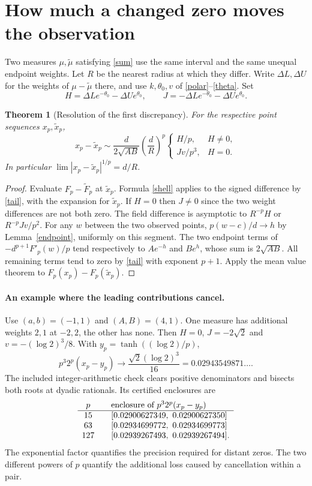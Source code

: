 \documentclass[11pt,letterpaper]{article}
\newtheorem{theorem}{Theorem}
\numberwithin{equation}{section}
\begin{document}
\section{How much a changed zero moves the observation}
Two measures $\mu,\widetilde\mu$ satisfying \eqref{sum} use the same
interval and the same unequal endpoint weights. Let $R$ be the nearest
radius at which they differ. Write $\Delta L,\Delta U$ for the weights of
$\mu-\widetilde\mu$ there, and use $k,\theta_0,v$ of
\eqref{polar}--\eqref{theta}. Set
\[
 H=\Delta L e^{-\theta_0}-\Delta U e^{\theta_0},\qquad
 J=-\Delta L e^{-\theta_0}-\Delta U e^{\theta_0}.
\]
\begin{theorem}[Resolution of the first discrepancy]\label{rate}
For the respective point sequences $x_p,\widetilde x_p$,
\[
 x_p-\widetilde x_p\sim
 \frac{d}{2\sqrt{AB}}\left(\frac dR\right)^p
 \begin{cases}
 H/p,&H\ne0,\\
 Jv/p^3,&H=0.
 \end{cases}
\]
In particular $\lim|x_p-\widetilde x_p|^{1/p}=d/R$.
\end{theorem}
\begin{proof}
Evaluate $F_p-\widetilde F_p$ at $\widetilde x_p$. Formula
\eqref{shell} applies to the signed difference by \eqref{tail}, with the
expansion for $\widetilde x_p$. If $H=0$ then $J\ne0$ since the two weight
differences are not both zero. The field difference is asymptotic to
$R^{-p}H$ or $R^{-p}Jv/p^2$. For any $w$ between the two observed points,
$p(w-c)/d\to h$ by Lemma~\ref{endpoint}, uniformly on this segment.
The two endpoint terms of $-d^{p+1} F'_p(w)/p$ tend respectively to
$Ae^{-h}$ and $Be^h$, whose sum is $2\sqrt{AB}$. All remaining terms tend
to zero by \eqref{tail} with exponent $p+1$. Apply the mean value theorem to
$F_p(x_p)-F_p(\widetilde x_p)$.
\end{proof}

\paragraph{An example where the leading contributions cancel.}
Use $(a,b)=(-1,1)$ and $(A,B)=(4,1)$. One measure has additional weights
$2,1$ at $-2,2$, the other has none. Then $H=0$, $J=-2\sqrt2$ and
$v=-(\log 2)^3/8$. With $y_p=\tanh((\log 2)/p)$,
\[
             p^3 2^p (x_p-y_p)\longrightarrow
             \frac{\sqrt2(\log 2)^3}{16}=0.02943549871\ldots .
\]
The included integer-arithmetic check clears positive denominators and
bisects both roots at dyadic rationals. Its certified enclosures are
\[
\begin{array}{c@{\qquad}l}
p&\text{enclosure of }p^3 2^p(x_p-y_p)\\ \hline
15 &[0.02900627349,\ 0.02900627350]\\
63 &[0.02934699772,\ 0.02934699773]\\
127 &[0.02939267493,\ 0.02939267494].
\end{array}
\]
The exponential factor quantifies the precision required for distant
zeros. The two different powers of $p$ quantify the additional loss caused
by cancellation within a pair.
\newpage
\end{document}
